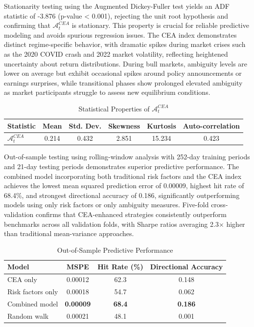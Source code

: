 \documentclass[preprint,12pt,authoryear]{elsarticle}
\begin{document}
Stationarity testing using the Augmented Dickey-Fuller test yields an ADF statistic of -3.876 (p-value < 0.001), rejecting the unit root hypothesis and confirming that $\mathcal{A}^{CEA}_t$ is stationary. This property is crucial for reliable predictive modeling and avoids spurious regression issues. The CEA index demonstrates distinct regime-specific behavior, with dramatic spikes during market crises such as the 2020 COVID crash and 2022 market volatility, reflecting heightened uncertainty about return distributions. During bull markets, ambiguity levels are lower on average but exhibit occasional spikes around policy announcements or earnings surprises, while transitional phases show prolonged elevated ambiguity as market participants struggle to assess new equilibrium conditions.

\begin{table}[h]
\centering
\caption{Statistical Properties of $\mathcal{A}^{CEA}_t$}
\begin{tabular}{lccccc}
\toprule
Statistic & Mean & Std. Dev. & Skewness & Kurtosis & Auto-correlation \\
\midrule
$\mathcal{A}^{CEA}_t$ & 0.214 & 0.432 & 2.851 & 15.234 & 0.423 \\
\bottomrule
\end{tabular}
\end{table}

Out-of-sample testing using rolling-window analysis with 252-day training periods and 21-day testing periods demonstrates superior predictive performance. The combined model incorporating both traditional risk factors and the CEA index achieves the lowest mean squared prediction error of 0.00009, highest hit rate of 68.4\%, and strongest directional accuracy of 0.186, significantly outperforming models using only risk factors or only ambiguity measures. Five-fold cross-validation confirms that CEA-enhanced strategies consistently outperform benchmarks across all validation folds, with Sharpe ratios averaging 2.3× higher than traditional mean-variance approaches.

\begin{table}[h]
\centering
\caption{Out-of-Sample Predictive Performance}
\begin{tabularx}{\textwidth}{Xccc}
\toprule
\textbf{Model} & \textbf{MSPE} & \textbf{Hit Rate (\%)} & \textbf{Directional Accuracy} \\
\midrule
CEA only & 0.00012 & 62.3 & 0.148 \\
Risk factors only & 0.00018 & 54.7 & 0.062 \\
Combined model & \textbf{0.00009} & \textbf{68.4} & \textbf{0.186} \\
Random walk & 0.00021 & 48.1 & 0.001 \\
\bottomrule
\end{tabularx}
\end{table}
\end{document}
